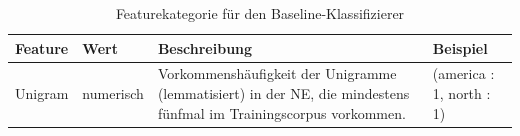 \documentclass[bibliography=totoc]{scrartcl}
\begin{document}
\begin{appendices}
					 \begin{table}[H]
					 	\centering
					 	\caption{Verteilung der Klassen nach Balancierung}
					 		\label{tab:countclasses}
					 	\end{table}
					 	
					 						 \begin{table}[H]
					 						 	\centering
					 						 	\caption{Featurekategorie für den Baseline-Klassifizierer}
					 						 	\begin{tabularx}{\textwidth}{llXl}
					 						 		\toprule
					 						 		Feature & Wert & Beschreibung & Beispiel\\
					 						 		\midrule
					 						 		Unigram & numerisch & Vorkommenshäufigkeit der Unigramme (lemmatisiert) in der NE, die mindestens fünfmal im Trainingscorpus vorkommen. \cite{Mayfield2003} & (america : 1, north : 1)\\
					 						 		\bottomrule
					 						 	\end{tabularx}
					 						 	\label{tab:baseline}
					 						 \end{table}
					 						 

\end{appendices}
\end{document}

